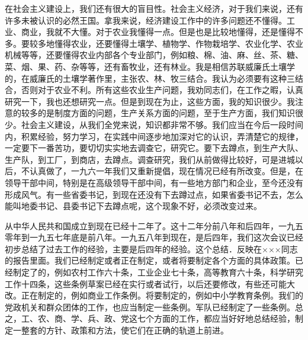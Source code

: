 在社会主义建设上，我们还有很大的盲目性。社会主义经济，对于我们来说，还有许多未被认识的必然王国。拿我来说，经济建设工作中的许多问题还不懂得。工业、商业，我就不大懂。对于农业我懂得一点。但是也是比较地懂得，还是懂得不多。要较多地懂得农业，还要懂得土壤学、植物学、作物栽培学、农业化学、农业机械等等，还要懂得农业内部各个专业部门，例如粮、棉、油、麻、丝、茶、糖、菜、烟、果、药、杂等等，还有畜牧业，还有林业。我是相信苏联威廉氏土壤学的，在威廉氏的土壤学著作里，主张农、林、牧三结合。我认为必须要有这种三结合，否则对于农业不利。所有这些农业生产问题，我劝同志们，在工作之暇，认真研究一下，我也还想研究一点。但是到现在为止，这些方面，我的知识很少。我注意的较多的是制度方面的问题，生产关系方面的问题，至于生产方面，我们知识很少。社会主义建设，从我们全党来说，知识都非常不够。我们应当在今后一段时间内，积累经验，努力学习，在实践中间逐步地加深对它的认识，弄清楚它的规律，一定要下一番苦功，要切切实实地去调查它，研究它。要下去蹲点，到生产大队、生产队，到工厂，到商店，去蹲点。调查研究，我们从前做得比较好，可是进城以后，不认真做了，一九六一年我们又重新提倡，现在情况已经有所改变。但是，在领导干部中间，特别是在高级领导干部中间，有一些地方部门和企业，至今还没有形成风气。有一些省委书记，到现在还没有下去蹲过点，如果省委书记不去，怎么能叫地委书记、县委书记下去蹲点呢，这个现象不好，必须改变过来。

从中华人民共和国成立到现在已经十二年了。这十二年分前八年和后四年，一九五零年到一九五七年底是前八年。一九五八年到现在，是后四年，我们这次会议已经初步总结了过去工作的经验，主要是后四年的经验。这个总结．反映在×××同志的报告里面。我们已经制定或者正在制定，或者将要制定各个方面的具体政策。已经制定了的，例如农村工作六十条，工业企业七十条，高等教育六十条，科学研究工作十四条，这些条例草案已经在实行或者试行，以后还要修改，有些还可能大改。正在制定的，例如商业工作条例。将要制定的，例如中小学教育条例。我们的党政机关和群众团体的工作，也应当制定一些条例。军队已经制定了一些条例。总之，工、农、商、学、兵、政、党这七个方面的工作，都应当好好地总结经验，制定一整套的方针、政策和方法，使它们在正确的轨道上前进。

